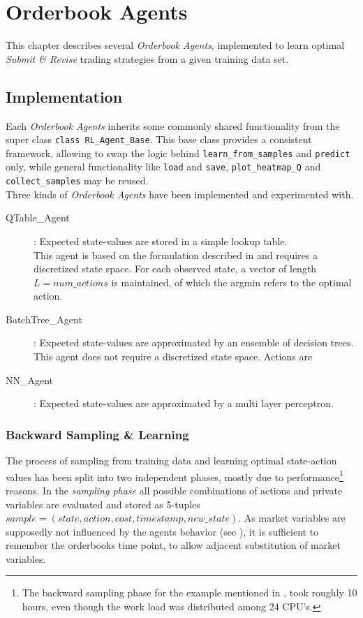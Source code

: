 \chapter{Orderbook Agents}
This chapter describes several \emph{Orderbook Agents}, implemented to learn optimal \emph{Submit \& Revise} trading strategies from a given training data set.


\section{Implementation}
\label{chap:experiments:implementation}
Each \emph{Orderbook Agents} inherits some commonly shared functionality from the super class \lstinline!class RL_Agent_Base!. This base class provides a consistent framework, allowing to swap the logic behind \lstinline!learn_from_samples! and \lstinline!predict! only, while general functionality like \lstinline!load! and \lstinline!save!, \lstinline!plot_heatmap_Q! and \lstinline!collect_samples! may be reused.\\

Three kinds of \emph{Orderbook Agents} have been implemented and experimented with.

\begin{description}
\item[QTable\_Agent] : Expected state-values are stored in a simple lookup table.\\
This agent is based on the formulation described in  and requires a discretized state space. For each observed state, a vector of length $L=num\_actions$ is maintained, of which the argmin refers to the optimal action.
\item[BatchTree\_Agent]:  Expected state-values are approximated by an ensemble of decision trees.
This agent does not require a discretized state space. Actions are 
\item[NN\_Agent] : Expected state-values are approximated by a multi layer perceptron.
\end{description}

\subsection{Backward Sampling \& Learning}
The process of sampling from training data and learning optimal state-action values has been split into two independent phases, mostly due to performance\footnote{The backward sampling phase for the example mentioned in , took roughly 10 hours, even though the work load was distributed among 24 CPU's.} reasons. In the \emph{sampling phase} all possible combinations of actions and private variables are evaluated and stored as 5-tuples $sample=(state, action, cost, timestamp, new\_state)$. As market variables are supposedly not influenced by the agents behavior (see ), it is sufficient to remember the orderbooks time point, to allow adjacent substitution of market variables.\\

